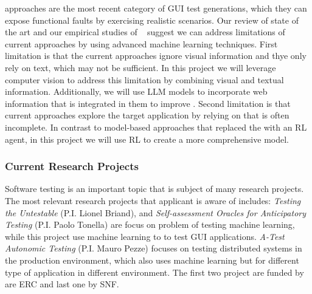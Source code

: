
\smallskip 
\testreuse approaches are the most recent category of GUI test generations, which they can expose functional faults by exercising realistic scenarios.
Our review of state of the art and our empirical studies of \testreuse~\cite{mariani:SemFinder:ISSTA:2021,khalili:DomainEmbedding:ICPC:2022} suggest  we can address limitations of current approaches by using advanced machine learning techniques.
First limitation is that the current \testreuse approaches ignore visual information and thye only rely on text, which may not be sufficient. 
In this project we will leverage computer vision to address this limitation by combining visual and textual information.
Additionally, we will use LLM models to incorporate web information that is integrated in them to improve \testreuse. 
Second limitation is that current approaches explore the target application by relying on \tam that is often incomplete.
In contrast to model-based approaches that replaced the \tam with an RL agent, in this project we will use RL to create a more comprehensive model.


\subsubsection{Current Research Projects}
Software testing is an important topic that is subject of many research projects.
The most relevant research projects that applicant is aware of includes:
\textit{Testing the Untestable} (P.I. Lionel Briand), and
\textit{Self-assessment Oracles for Anticipatory Testing} (P.I. Paolo Tonella) are focus on problem of testing machine learning, while this project use machine learning to to test GUI applications.
\textit{A-Test Autonomic Testing} (P.I. Mauro Pezze) focuses on testing distributed systems in the production environment, which also uses machine learning but for different type of application in different environment. 
The first two project are funded by are ERC and last one by SNF.



